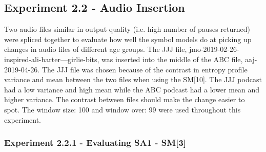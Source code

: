 %
%
%

\subsection{Experiment 2.2 - Audio Insertion}
Two audio files similar in output quality (i.e. high number of pauses returned) were spliced together to evaluate how well the symbol models do at picking up changes in audio files of different age groups. The JJJ file, jmo-2019-02-26-inspired-ali-barter---girlie-bits, was inserted into the middle of the ABC file, aaj-2019-04-26. The JJJ file was chosen because of the contrast in entropy profile variance and mean between the two files when using the SM[10]. The JJJ podcast had a low variance and high mean while the ABC podcast had a lower mean and higher variance. The contrast between files should make the change easier to spot. The window size: 100 and window over: 99 were used throughout this experiment.

\subsubsection{Experiment 2.2.1 - Evaluating SA1 - SM[3]}


